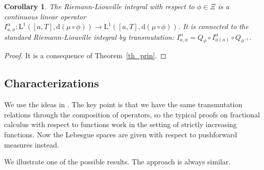 \documentclass[12pt,reqno]{amsart}
\theoremstyle{plain}
\newtheorem{corollary}[theorem]{Corollary}
\numberwithin{equation}{section} %
\begin{document}
\begin{corollary} \label{cor_indi}
The Riemann-Liouville integral with respect to $\phi\in\Xi$ is a continuous linear operator $I_{a,\phi}^\alpha:\mathrm{L}^1([a,T],\mathrm{d}(\mu\circ\phi))\rightarrow \mathrm{L}^1([a,T],\mathrm{d}(\mu\circ\phi))$.
It is connected to the standard Riemann-Liouville integral by transmutation:
$I_{a,\phi}^\alpha=Q_\phi \circ I_{\phi(a)}^\alpha\circ Q_{\phi^{-1}}$.
\end{corollary}
\begin{proof}
It is a consequence of Theorem~\ref{th_prin}.
\end{proof}

\subsection{Characterizations}

We use the ideas in \cite{cao_jie,meu}. The key point is that we have the same transmutation relations through the composition of operators, so the typical proofs on fractional calculus with respect to functions work in the setting of strictly increasing functions. Now the Lebesgue spaces are given with respect to pushforward measures instead.

We illustrate one of the possible results. The approach is always similar.
\end{document}
